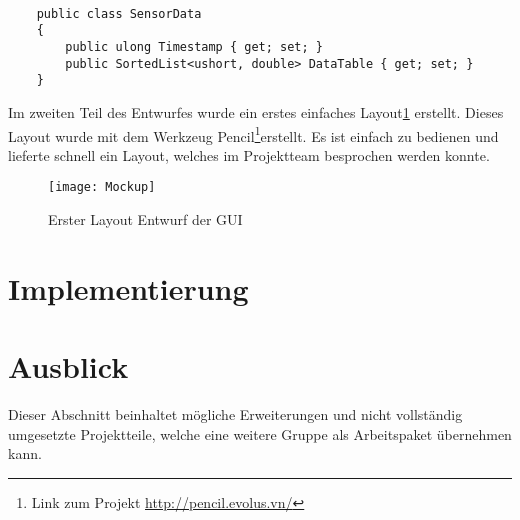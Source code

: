 \begin{lstlisting}[frame=single, caption=Beschreibung der Sensordatenstruktur, label=lst:SensorData]

    public class SensorData
    {
        public ulong Timestamp { get; set; }
        public SortedList<ushort, double> DataTable { get; set; }
    }
\end{lstlisting}



Im zweiten Teil des Entwurfes wurde ein erstes einfaches Layout\ref{fig:gui} erstellt. Dieses Layout wurde mit dem Werkzeug Pencil\footnote{Link zum Projekt \url{http://pencil.evolus.vn/}}erstellt. Es ist einfach zu bedienen und lieferte schnell ein Layout, welches im Projektteam besprochen werden konnte.

\begin{figure}[h]
	\centering
		\texttt{[image: Mockup]}
		\caption{Erster Layout Entwurf der GUI}
		\label{fig:gui}
\end{figure}


\section{Implementierung}
 
\section{Ausblick}
Dieser Abschnitt beinhaltet mögliche Erweiterungen und nicht vollständig umgesetzte Projektteile, welche eine weitere Gruppe als Arbeitspaket übernehmen kann. 




